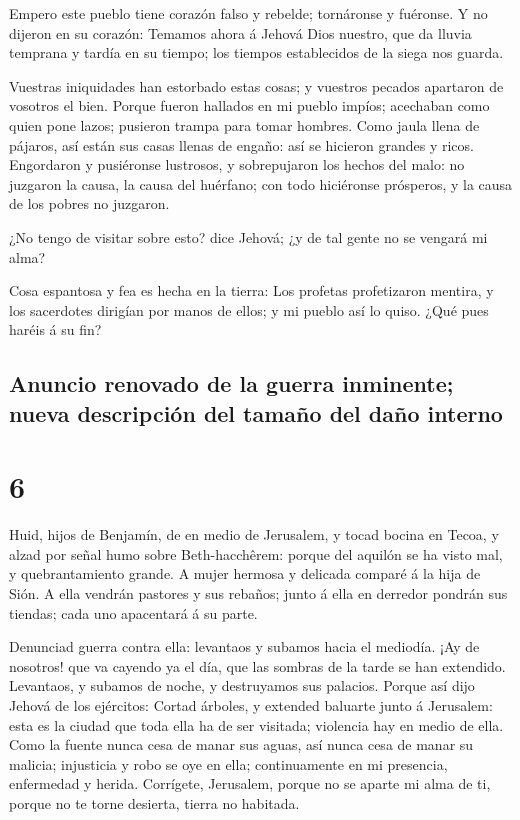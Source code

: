  Empero este pueblo tiene corazón falso y rebelde;
tornáronse y fuéronse.  Y no dijeron en su corazón:
Temamos ahora á Jehová Dios nuestro, que da lluvia temprana y tardía en
su tiempo; los tiempos establecidos de la siega nos guarda.

 Vuestras iniquidades han estorbado estas cosas; y
vuestros pecados apartaron de vosotros el bien.  Porque
fueron hallados en mi pueblo impíos; acechaban como quien pone lazos;
pusieron trampa para tomar hombres.  Como jaula llena de
pájaros, así están sus casas llenas de engaño: así se hicieron grandes y
ricos.  Engordaron y pusiéronse lustrosos, y sobrepujaron
los hechos del malo: no juzgaron la causa, la causa del huérfano; con
todo hiciéronse prósperos, y la causa de los pobres no juzgaron.

 ¿No tengo de visitar sobre esto? dice Jehová; ¿y de tal
gente no se vengará mi alma?

 Cosa espantosa y fea es hecha en la tierra:
 Los profetas profetizaron mentira, y los sacerdotes
dirigían por manos de ellos; y mi pueblo así lo quiso. ¿Qué pues haréis
á su fin?

\hypertarget{anuncio-renovado-de-la-guerra-inminente-nueva-descripciuxf3n-del-tamauxf1o-del-dauxf1o-interno}{%
\subsection{Anuncio renovado de la guerra inminente; nueva descripción
del tamaño del daño
interno}\label{anuncio-renovado-de-la-guerra-inminente-nueva-descripciuxf3n-del-tamauxf1o-del-dauxf1o-interno}}

\hypertarget{section-24-6}{%
\section{6}\label{section-24-6}}

 Huid, hijos de Benjamín, de en medio de Jerusalem, y
tocad bocina en Tecoa, y alzad por señal humo sobre Beth-hacchêrem:
porque del aquilón se ha visto mal, y quebrantamiento grande.
 A mujer hermosa y delicada comparé á la hija de Sión.
 A ella vendrán pastores y sus rebaños; junto á ella en
derredor pondrán sus tiendas; cada uno apacentará á su parte.

 Denunciad guerra contra ella: levantaos y subamos hacia
el mediodía. ¡Ay de nosotros! que va cayendo ya el día, que las sombras
de la tarde se han extendido.  Levantaos, y subamos de
noche, y destruyamos sus palacios.  Porque así dijo Jehová
de los ejércitos: Cortad árboles, y extended baluarte junto á Jerusalem:
esta es la ciudad que toda ella ha de ser visitada; violencia hay en
medio de ella.  Como la fuente nunca cesa de manar sus
aguas, así nunca cesa de manar su malicia; injusticia y robo se oye en
ella; continuamente en mi presencia, enfermedad y herida. 
Corrígete, Jerusalem, porque no se aparte mi alma de ti, porque no te
torne desierta, tierra no habitada.

